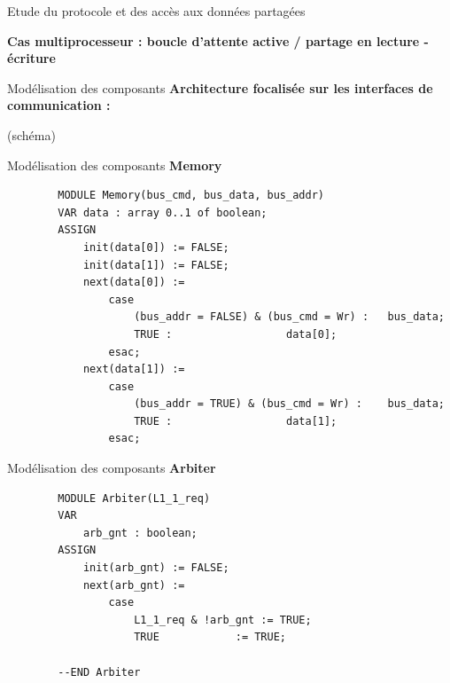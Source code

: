 \documentclass{beamer}
\begin{document}
\begin{frame}{Etude du protocole et des accès aux données partagées}

    \textbf{Cas multiprocesseur : boucle d’attente active / partage en lecture - \hspace*{3.8cm} écriture}
    \vspace*{1.52cm}

\end{frame}

\begin{frame}[fragile]{Modélisation des composants}
    \textbf{Architecture focalisée sur les interfaces de communication :}

    \centering
    (schéma)
\end{frame}

\begin{frame}[fragile]{Modélisation des composants}
    \textbf{Memory}
    \begin{lstlisting}
        MODULE Memory(bus_cmd, bus_data, bus_addr)
        VAR data : array 0..1 of boolean;
        ASSIGN
            init(data[0]) := FALSE;
            init(data[1]) := FALSE;
            next(data[0]) :=
                case
                    (bus_addr = FALSE) & (bus_cmd = Wr) : 	bus_data;
                    TRUE :					data[0];
                esac;
            next(data[1]) :=
                case
                    (bus_addr = TRUE) & (bus_cmd = Wr) :	bus_data;
                    TRUE :					data[1];
                esac;
    \end{lstlisting}
\end{frame}

\begin{frame}[fragile]{Modélisation des composants}
    \textbf{Arbiter}
    \begin{lstlisting}
        MODULE Arbiter(L1_1_req)
        VAR
            arb_gnt : boolean;
        ASSIGN
            init(arb_gnt) := FALSE;
            next(arb_gnt) := 
                case
                    L1_1_req & !arb_gnt	:= TRUE;
                    TRUE			:= TRUE;
            
        --END Arbiter
    \end{lstlisting}
\end{frame}
\end{document}
